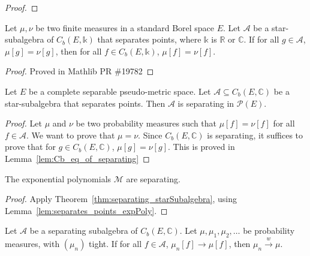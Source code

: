\begin{proof}\leanok
{}
\end{proof}


\begin{lemma}\label{lem:Cb_eq_of_separating}
Let $\mu, \nu$ be two finite measures in a standard Borel space $E$. Let $\mathcal{A}$ be a star-subalgebra of $C_b(E, \mathbb{k})$ that separates points, where $\mathbb{k}$ is $\mathbb{R}$ or $\mathbb{C}$.
If for all $g \in \mathcal A$, $\mu[g] = \nu[g]$, then for all $f \in C_b(E, \mathbb{k})$, $\mu[f] = \nu[f]$.
\end{lemma}

\begin{proof}
Proved in Mathlib PR \#19782
\end{proof}


\begin{theorem}\label{thm:separating_starSubalgebra}
Let $E$ be a complete separable pseudo-metric space. Let $\mathcal A \subseteq C_b(E, \mathbb{C})$ be a star-subalgebra that separates points. Then $\mathcal A$ is separating in $\mathcal P(E)$.
\end{theorem}

\begin{proof}
Let $\mu$ and $\nu$ be two probability measures such that $\mu[f] = \nu[f]$ for all $f \in \mathcal A$. We want to prove that $\mu = \nu$. Since $C_b(E, \mathbb{C})$ is separating, it suffices to prove that for $g \in C_b(E, \mathbb{C})$, $\mu[g] = \nu[g]$. This is proved in Lemma~\ref{lem:Cb_eq_of_separating}
\end{proof}


\begin{lemma}\label{lem:separating_expPoly}
The exponential polynomials $\mathcal M$ are separating.
\end{lemma}

\begin{proof}
Apply Theorem~\ref{thm:separating_starSubalgebra}, using Lemma~\ref{lem:separates_points_expPoly}.
\end{proof}


\begin{lemma}\label{lem:cvg_of_separating}
\leanok
{}
Let $\mathcal A$ be a separating subalgebra of $C_b(E, \mathbb{C})$. Let $\mu, \mu_1, \mu_2, \ldots$ be probability measures, with $(\mu_n)$ tight. If for all $f \in \mathcal A$, $\mu_n[f] \to \mu[f]$, then $\mu_n \xrightarrow{w} \mu$.
\end{lemma}

